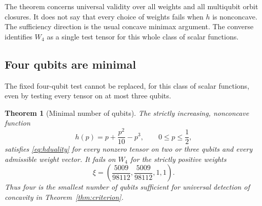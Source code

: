 \documentclass[11pt,a4paper]{article}
\newtheorem{theorem}{Theorem}
\begin{document}
The theorem concerns universal validity over all weights and all
multiqubit orbit closures. It does not say that every choice of
weights fails when \(h\) is nonconcave. The sufficiency direction
is the usual concave minimax argument. The converse identifies
\(W_4\) as a single test tensor for this whole class of scalar functions.

\subsection{Four qubits are minimal}
The fixed four-qubit test cannot be replaced, for this class of scalar
functions, even by testing every tensor on at most three qubits.

\begin{theorem}[Minimal number of qubits]\label{thm:minimality}
The strictly increasing, nonconcave function
\[
 h(p)=p+\frac{p^2}{10}-p^3,\qquad 0\le p\le\frac12,
\]
satisfies \eqref{eq:hduality} for every nonzero tensor on two or three
qubits and every admissible weight vector. It fails on \(W_4\) for
the strictly positive weights
\[
 \xi=\left(\frac{5009}{98112},\frac{5009}{98112},1,1\right).
\]
Thus four is the smallest number of qubits sufficient for universal
detection of concavity in Theorem~\ref{thm:criterion}.
\end{theorem}
\end{document}
